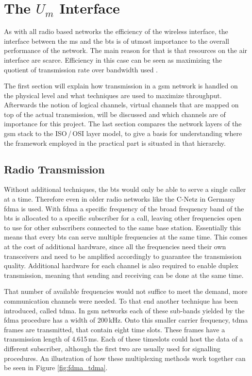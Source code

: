 \section{The $U_m$ Interface}
\label{sec:Um}
As with all radio based networks the efficiency of the wireless interface, the interface between the \gls{ms} and the \gls{bts} is of utmost importance to the overall performance of the network.
The main reason for that is that resources on the air interface are scarce.
Efficiency in this case can be seen as maximizing the quotient of transmission rate over bandwidth used \cite{protocols1999}.

The first section will explain how transmission in a \gls{gsm} network is handled on the physical level and what techniques are used to maximize throughput.
Afterwards the notion of logical channels, virtual channels that are mapped on top of the actual transmission, will be discussed and which channels are of importance for this project.
The last section compares the network layers of the \gls{gsm} stack to the ISO\,/\,OSI layer model, to give a basis for understanding where the framework employed in the practical part is situated in that hierarchy.

\subsection{Radio Transmission}
\label{sec:radio}
Without additional techniques, the \gls{bts} would only be able to serve a single caller at a time. 
Therefore even in older radio networks like the C-Netz in Germany \gls{fdma} is used.
With \gls{fdma} a specific frequency of the broad frequency band of the \gls{bts} is allocated to a specific subscriber for a call, leaving other frequencies open to use for other subscribers connected to the same base station.
Essentially this means that every \gls{bts} can serve multiple frequencies at the same time.
This comes at the cost of additional hardware, since all the frequencies need their own transceivers and need to be amplified accordingly to guarantee the transmission quality.
Additional hardware for each channel is also required to enable duplex transmission, meaning that sending and receiving can be done at the same time.

That number of available frequencies would not suffice to meet the demand, more communication channels were needed.
To that end another technique has been introduced, called \gls{tdma}.
In \gls{gsm} networks each of these sub-bands yielded by the \gls{fdma} procedure has a width of 200\,kHz.
Onto this smaller carrier frequency, \gls{tdma} frames are transmitted, that contain eight time slots.
These frames have a transmission length of 4.615\,ms.
Each of these timeslots could host the data of a different subscriber, although the first two are usually used for signalling procedures.
An illustration of how these multiplexing methods work together can be seen in Figure \ref{fig:fdma_tdma}.

